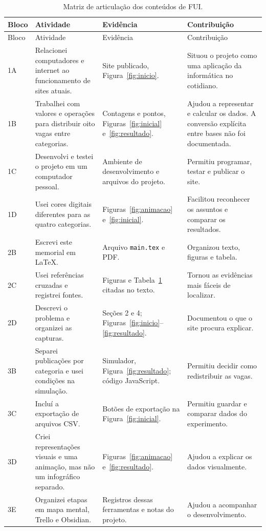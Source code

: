 \documentclass[11pt,a4paper]{article}
\begin{document}
\small
\begin{longtable}{>{\raggedright\arraybackslash}p{1.0cm}>{\raggedright\arraybackslash}p{4.0cm}>{\raggedright\arraybackslash}p{4.0cm}>{\raggedright\arraybackslash}p{5.1cm}}
\caption{Matriz de articulação dos conteúdos de FUI.}\label{tab:matriz}\\
\toprule Bloco & Atividade & Evidência & Contribuição \\\midrule\endfirsthead
\toprule Bloco & Atividade & Evidência & Contribuição \\\midrule\endhead
1A & Relacionei computadores e internet ao funcionamento de sites atuais. & Site publicado, Figura~\ref{fig:inicio}. & Situou o projeto como uma aplicação da informática no cotidiano. \\
1B & Trabalhei com valores e operações para distribuir oito vagas entre categorias. & Contagens e pontos, Figuras~\ref{fig:inicial} e~\ref{fig:resultado}. & Ajudou a representar e calcular os dados. A conversão explícita entre bases não foi documentada. \\
1C & Desenvolvi e testei o projeto em um computador pessoal. & Ambiente de desenvolvimento e arquivos do projeto. & Permitiu programar, testar e publicar o site. \\
1D & Usei cores digitais diferentes para as quatro categorias. & Figuras~\ref{fig:animacao} e~\ref{fig:inicial}. & Facilitou reconhecer os assuntos e comparar os resultados. \\
2B & Escrevi este memorial em LaTeX. & Arquivo \texttt{main.tex} e PDF. & Organizou texto, figuras e tabela. \\
2C & Usei referências cruzadas e registrei fontes. & Figuras e Tabela~\ref{tab:matriz} citadas no texto. & Tornou as evidências mais fáceis de localizar. \\
2D & Descrevi o problema e organizei as capturas. & Seções 2 e 4; Figuras~\ref{fig:inicio}--\ref{fig:resultado}. & Documentou o que o site procura explicar. \\
3B & Separei publicações por categoria e usei condições na simulação. & Simulador, Figura~\ref{fig:resultado}; código JavaScript. & Permitiu decidir como redistribuir as vagas. \\
3C & Incluí a exportação de arquivos CSV. & Botões de exportação na Figura~\ref{fig:inicial}. & Permitiu guardar e comparar dados do experimento. \\
3D & Criei representações visuais e uma animação, mas não um infográfico separado. & Figuras~\ref{fig:animacao} e~\ref{fig:resultado}. & Ajudou a explicar os dados visualmente. \\
3E & Organizei etapas em mapa mental, Trello e Obsidian. & Registros dessas ferramentas e notas do projeto. & Ajudou a acompanhar o desenvolvimento. \\
\bottomrule
\end{longtable}
\normalsize
\end{document}
